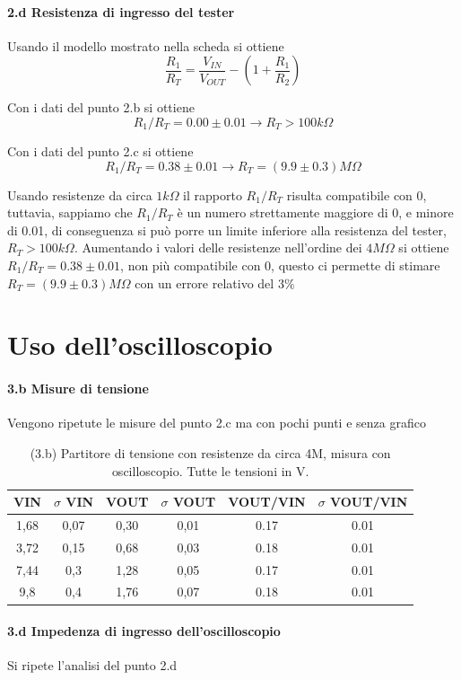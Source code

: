 \documentclass[10pt,a4paper]{article}
\begin{document}
\paragraph{2.d Resistenza di ingresso del tester}
Usando il modello mostrato nella scheda si ottiene
\[ \frac{R_1}{R_T} =  \frac{V_{IN}}{V_{OUT}} - (1 +  \frac{R_1}{R_2} )
\]

Con i dati del punto 2.b si ottiene
\[ R_1/R_T = 0.00  \pm  0.01   \rightarrow  R_T > 100 k\Omega
\]


Con i dati del punto 2.c si ottiene
\[ R_1/R_T = 0.38  \pm  0.01   \rightarrow  R_T = ( 9.9\pm  0.3)  M\Omega
\]

Usando resistenze da circa $1 k\Omega$ il rapporto $R_1/R_T$ risulta compatibile con 0, tuttavia, sappiamo che $R_1/R_T$ è un numero strettamente maggiore di 0, e minore di 0.01, di conseguenza si può porre un limite inferiore alla resistenza del tester, $R_T>100 k\Omega$. Aumentando i valori delle resistenze nell'ordine dei $4M\Omega$ si ottiene $R_1/R_T = 0.38  \pm  0.01$, non più compatibile con 0, questo ci permette di stimare $R_T=( 9.9\pm  0.3)  M\Omega$  con un errore relativo del $3\%$


\section{Uso dell'oscilloscopio}

\paragraph{3.b Misure di tensione} 
Vengono ripetute le misure del punto 2.c  ma con pochi punti e senza grafico
\begin{table}[h]
\centering
\begin{tabular}{|c|c|c|c|c|c|}
\hline 
VIN& $\sigma$ VIN  &VOUT	 & $\sigma$ VOUT& VOUT/VIN & $\sigma$ VOUT/VIN \\
\hline 
1,68 & 0,07 & 0,30 & 0,01 & 0.17 & 0.01\\
3,72 & 0,15 & 0,68 & 0,03 & 0.18 & 0.01 \\
7,44 & 0,3 & 1,28 & 0,05 & 0.17 & 0.01 \\
9,8 & 0,4 & 1,76 & 0,07 & 0.18 & 0.01 \\
\hline 
\end{tabular} 
\caption{(3.b) Partitore di tensione con resistenze da circa 4M, misura con oscilloscopio. Tutte le tensioni in V.}
\end{table}


\paragraph{3.d Impedenza di ingresso dell'oscilloscopio} Si ripete l'analisi del punto 2.d
\end{document}
